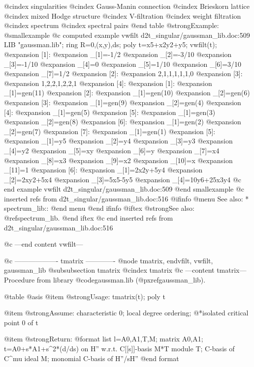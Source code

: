@cindex singularities
@cindex Gauss-Manin connection
@cindex Brieskorn lattice
@cindex mixed Hodge structure
@cindex V-filtration
@cindex weight filtration
@cindex spectrum
@cindex spectral pairs
@end table
@strong{Example:}
@smallexample
@c computed example vwfilt d2t_singular/gaussman_lib.doc:509 
LIB "gaussman.lib";
ring R=0,(x,y),ds;
poly t=x5+x2y2+y5;
vwfilt(t);
@expansion{} [1]:
@expansion{}    _[1]=-1/2
@expansion{}    _[2]=-3/10
@expansion{}    _[3]=-1/10
@expansion{}    _[4]=0
@expansion{}    _[5]=1/10
@expansion{}    _[6]=3/10
@expansion{}    _[7]=1/2
@expansion{} [2]:
@expansion{}    2,1,1,1,1,1,0
@expansion{} [3]:
@expansion{}    1,2,2,1,2,2,1
@expansion{} [4]:
@expansion{}    [1]:
@expansion{}       _[1]=gen(11)
@expansion{}    [2]:
@expansion{}       _[1]=gen(10)
@expansion{}       _[2]=gen(6)
@expansion{}    [3]:
@expansion{}       _[1]=gen(9)
@expansion{}       _[2]=gen(4)
@expansion{}    [4]:
@expansion{}       _[1]=gen(5)
@expansion{}    [5]:
@expansion{}       _[1]=gen(3)
@expansion{}       _[2]=gen(8)
@expansion{}    [6]:
@expansion{}       _[1]=gen(2)
@expansion{}       _[2]=gen(7)
@expansion{}    [7]:
@expansion{}       _[1]=gen(1)
@expansion{} [5]:
@expansion{}    _[1]=y5
@expansion{}    _[2]=y4
@expansion{}    _[3]=y3
@expansion{}    _[4]=y2
@expansion{}    _[5]=xy
@expansion{}    _[6]=y
@expansion{}    _[7]=x4
@expansion{}    _[8]=x3
@expansion{}    _[9]=x2
@expansion{}    _[10]=x
@expansion{}    _[11]=1
@expansion{} [6]:
@expansion{}    _[1]=2x2y+5y4
@expansion{}    _[2]=2xy2+5x4
@expansion{}    _[3]=5x5-5y5
@expansion{}    _[4]=10y6+25x3y4
@c end example vwfilt d2t_singular/gaussman_lib.doc:509
@end smallexample
@c inserted refs from d2t_singular/gaussman_lib.doc:516
@ifinfo
@menu
See also:
* spectrum_lib::
@end menu
@end ifinfo
@iftex
@strong{See also:}
@ref{spectrum_lib}.
@end iftex
@c end inserted refs from d2t_singular/gaussman_lib.doc:516

@c ---end content vwfilt---

@c ------------------- tmatrix -------------
@node tmatrix, endvfilt, vwfilt, gaussman_lib
@subsubsection tmatrix
@cindex tmatrix
@c ---content tmatrix---
Procedure from library @code{gaussman.lib} (@pxref{gaussman_lib}).

@table @asis
@item @strong{Usage:}
tmatrix(t); poly t

@item @strong{Assume:}
characteristic 0; local degree ordering;
@*isolated critical point 0 of t

@item @strong{Return:}
@format
list l=A0,A1,T,M;
  matrix A0,A1;  t=A0+s*A1+s^2*(d/ds) on H'' w.r.t. C[[s]]-basis M*T
  module T;  C-basis of C^mu
  ideal M;  monomial C-basis of H''/sH''
@end format


